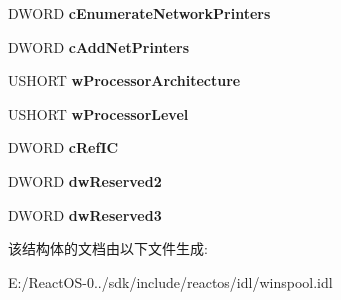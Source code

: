 \begin{DoxyCompactItemize}
D\+W\+O\+RD {\bfseries c\+Enumerate\+Network\+Printers}
\item 
\mbox{\label{struct___w_i_n_s_p_o_o_l___p_r_i_n_t_e_r___i_n_f_o___s_t_r_e_s_s_abbca341b8024e60262859399312b3912}} 
D\+W\+O\+RD {\bfseries c\+Add\+Net\+Printers}
\item 
\mbox{\label{struct___w_i_n_s_p_o_o_l___p_r_i_n_t_e_r___i_n_f_o___s_t_r_e_s_s_aa98edf9572c6c5750ea684d9d986a629}} 
U\+S\+H\+O\+RT {\bfseries w\+Processor\+Architecture}
\item 
\mbox{\label{struct___w_i_n_s_p_o_o_l___p_r_i_n_t_e_r___i_n_f_o___s_t_r_e_s_s_aedae9819d7b077e0a7237777db6ebc61}} 
U\+S\+H\+O\+RT {\bfseries w\+Processor\+Level}
\item 
\mbox{\label{struct___w_i_n_s_p_o_o_l___p_r_i_n_t_e_r___i_n_f_o___s_t_r_e_s_s_a7c645eb7646d6eaf6ec38530ddbfdeff}} 
D\+W\+O\+RD {\bfseries c\+Ref\+IC}
\item 
\mbox{\label{struct___w_i_n_s_p_o_o_l___p_r_i_n_t_e_r___i_n_f_o___s_t_r_e_s_s_adc89d790c3a46f111e14fe59bd29baf6}} 
D\+W\+O\+RD {\bfseries dw\+Reserved2}
\item 
\mbox{\label{struct___w_i_n_s_p_o_o_l___p_r_i_n_t_e_r___i_n_f_o___s_t_r_e_s_s_a7b3905ff958f9f43bdbd44fdc02468f0}} 
D\+W\+O\+RD {\bfseries dw\+Reserved3}
\end{DoxyCompactItemize}


该结构体的文档由以下文件生成\+:\begin{DoxyCompactItemize}
\item 
E\+:/\+React\+O\+S-\/0../sdk/include/reactos/idl/winspool.\+idl\end{DoxyCompactItemize}
